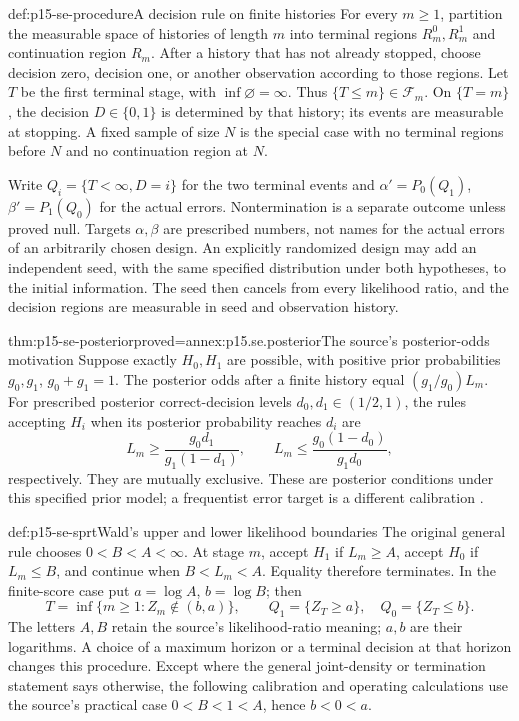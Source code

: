 \begin{hbdefinition}{def:p15-se-procedure}{A decision rule on finite histories}
For every \(m\geq1\), partition the measurable space of histories of
length \(m\) into terminal regions \(R_m^0,R_m^1\) and continuation
region \(R_m\). After a history that has not already stopped, choose
decision zero, decision one, or another observation according to those
regions. Let \(T\) be the first terminal stage, with
\(\inf\varnothing=\infty\). Thus \(\{T\leq m\}\in\mathcal F_m\).
On \(\{T=m\}\), the decision \(D\in\{0,1\}\) is determined by
that history; its events are measurable at stopping. A fixed sample of
size \(N\) is the special case with no terminal regions before \(N\)
and no continuation region at \(N\).

Write \(Q_i=\{T<\infty,D=i\}\) for the two terminal events and
\(\alpha'=P_0(Q_1)\), \(\beta'=P_1(Q_0)\) for the actual errors.
Nontermination is a separate outcome unless proved null. Targets
\(\alpha,\beta\) are prescribed numbers, not names for the actual
errors of an arbitrarily chosen design.
An explicitly randomized design may add an independent seed, with the
same specified distribution under both hypotheses, to the initial
information. The seed then cancels from every likelihood ratio, and
the decision regions are measurable in seed and observation history.
\end{hbdefinition}

\begin{hbtheorem}{thm:p15-se-posterior}{proved=annex:p15.se.posterior}{The source's posterior-odds motivation}
Suppose exactly \(H_0,H_1\) are possible, with positive prior
probabilities \(g_0,g_1\), \(g_0+g_1=1\). The posterior odds after
a finite history equal \((g_1/g_0)L_m\). For prescribed posterior
correct-decision levels \(d_0,d_1\in(1/2,1)\), the rules accepting
\(H_i\) when its posterior probability reaches \(d_i\) are
\[
 L_m\geq \frac{g_0d_1}{g_1(1-d_1)},\qquad
 L_m\leq \frac{g_0(1-d_0)}{g_1d_0},
\]
respectively. They are mutually exclusive. These are posterior
conditions under this specified prior model; a frequentist error target
is a different calibration \cite[Section 3.1]{Wald1945SequentialTests}.
\end{hbtheorem}

\begin{hbdefinition}{def:p15-se-sprt}{Wald's upper and lower likelihood boundaries}
The original general rule chooses \(0<B<A<\infty\). At stage
\(m\), accept \(H_1\) if
\(L_m\geq A\), accept \(H_0\) if \(L_m\leq B\), and continue
when \(B<L_m<A\). Equality therefore terminates. In the finite-score
case put \(a=\log A\), \(b=\log B\); then
\[
 T=\inf\{m\geq1:Z_m\notin(b,a)\},\qquad
 Q_1=\{Z_T\geq a\},\quad Q_0=\{Z_T\leq b\}.
\]
The letters \(A,B\) retain the source's likelihood-ratio meaning;
\(a,b\) are their logarithms. A choice of a maximum horizon or a
terminal decision at that horizon changes this procedure.
Except where the general joint-density or termination statement says
otherwise, the following calibration and operating calculations use
the source's practical case \(0<B<1<A\), hence \(b<0<a\).
\end{hbdefinition}

